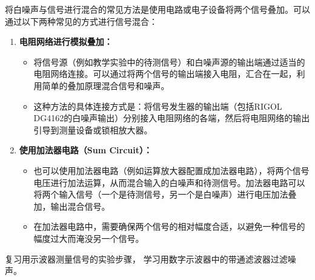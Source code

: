 \documentclass[dvipsnames, svgnames,a4paper,11pt]{article}
\begin{document}
	将白噪声与信号进行混合的常见方法是使用电路或电子设备将两个信号叠加。可以通过以下两种常见的方式进行信号混合：
	\begin{enumerate}
		\item \textbf{电阻网络进行模拟叠加：}
			\begin{itemize}
				\item 将信号源（例如教学实验中的待测信号）和白噪声源的输出端通过适当的电阻网络连接。可以通过将两个信号的输出端接入电阻，汇合在一起，利用简单的叠加原理混合信号和噪声。
				\item 这种方法的具体连接方式是：将信号发生器的输出端（包括RIGOL DG4162的白噪声输出）分别接入电阻网络的各端，然后将电阻网络的输出引导到测量设备或锁相放大器。
			\end{itemize}

		\item \textbf{使用加法器电路（Sum Circuit）：}
			\begin{itemize}
				\item 也可以使用加法器电路（例如运算放大器配置成加法器电路），将两个信号电压进行加法运算，从而混合输入的白噪声和待测信号。加法器电路可以将两个输入信号（一个是待测信号，另一个是白噪声）进行电压加法叠加，输出混合信号。
				\item 在加法器电路中，需要确保两个信号的相对幅度合适，以避免一种信号的幅度过大而淹没另一个信号。
			\end{itemize}
	\end{enumerate}













\begin{question}
	复习用示波器测量信号的实验步骤， 学习用数字示波器中的带通滤波器过滤噪声。
\end{question}
\end{document}
